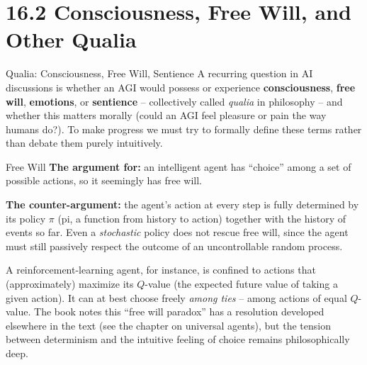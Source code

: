 \documentclass[aspectratio=169,10pt]{beamer}
\begin{document}
\section{16.2 Consciousness, Free Will, and Other Qualia}

\begin{frame}{Qualia: Consciousness, Free Will, Sentience}
  A recurring question in AI discussions is whether an AGI would possess or
  experience \textbf{consciousness}, \textbf{free will}, \textbf{emotions},
  or \textbf{sentience} -- collectively called \emph{qualia} in philosophy
  -- and whether this matters morally (could an AGI feel pleasure or pain
  the way humans do?). To make progress we must try to formally define
  these terms rather than debate them purely intuitively.
\end{frame}

\begin{frame}{Free Will}
  \textbf{The argument for:} an intelligent agent has ``choice'' among a set
  of possible actions, so it seemingly has free will.

  \vspace{0.3em}
  \textbf{The counter-argument:} the agent's action at every step is fully
  determined by its policy $\pi$ (pi, a function from history to action)
  together with the history of events so far. Even a \emph{stochastic}
  policy does not rescue free will, since the agent must still passively
  respect the outcome of an uncontrollable random process.

  \vspace{0.3em}
  A reinforcement-learning agent, for instance, is confined to actions that
  (approximately) maximize its $Q$-value (the expected future value of
  taking a given action). It can at best choose freely \emph{among ties} --
  among actions of equal $Q$-value. The book notes this ``free will
  paradox'' has a resolution developed elsewhere in the text (see the
  chapter on universal agents), but the tension between determinism and the
  intuitive feeling of choice remains philosophically deep.
\end{frame}
\end{document}
